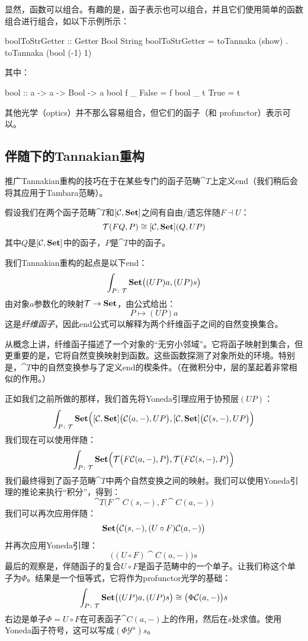 \documentclass[DaoFP]{subfiles}
\begin{document}
显然，函数可以组合。有趣的是，函子表示也可以组合，并且它们使用简单的函数组合进行组合，如以下示例所示：
\begin{haskell}
boolToStrGetter :: Getter Bool String
boolToStrGetter = toTannaka (show) . toTannaka (bool (-1) 1)
\end{haskell}
其中：
\begin{haskell}
bool :: a -> a -> Bool -> a
bool f _ False = f
bool _ t True  = t
\end{haskell}

其他光学（optics）并不那么容易组合，但它们的函子（和 profunctor）表示可以。

\subsection{伴随下的Tannakian重构}

推广Tannakian重构的技巧在于在某些专门的函子范畴$\cat T$上定义end（我们稍后会将其应用于Tambara范畴）。

假设我们在两个函子范畴$\cat T$和$[\mathcal{C}, \mathbf{Set}]$之间有自由/遗忘伴随$F \dashv U$：
\[ \mathcal{T} (F Q, P) \cong  [\mathcal{C}, \mathbf{Set}] ( Q, U P )\]
其中$Q$是$[\mathcal{C}, \mathbf{Set}]$中的函子，$P$是$\cat T$中的函子。

我们Tannakian重构的起点是以下end：
\[ \int_{P \colon \mathcal{T}} \mathbf{Set} \big((U P) a, (U P) s\big) \]
由对象$a$参数化的映射$\mathcal{T} \to \mathbf{Set}$，由公式给出：
\[ P \mapsto (U P) a \]
这是\emph{纤维函子}，因此end公式可以解释为两个纤维函子之间的自然变换集合。

从概念上讲，纤维函子描述了一个对象的“无穷小邻域”。它将函子映射到集合，但更重要的是，它将自然变换映射到函数。这些函数探测了对象所处的环境。特别是，$\cat T$中的自然变换参与了定义end的楔条件。（在微积分中，层的茎起着非常相似的作用。）

正如我们之前所做的那样，我们首先将Yoneda引理应用于协预层$(U P)$：
\[ \int_{P \colon \mathcal{T}} \mathbf{Set} \Big([\mathcal{C}, \mathbf{Set}] \big( \mathcal{C} (a ,-), U P\big), [\mathcal{C}, \mathbf{Set}] \big( \mathcal{C} (s ,-), U P\big)\Big) \]
我们现在可以使用伴随：
\[ \int_{P \colon \mathcal{T}} \mathbf{Set} \Big(\mathcal{T} \big( F \mathcal{C} (a ,-), P\big), \mathcal{T} \big( F \mathcal{C} (s ,-), P\big)\Big) \]
我们最终得到了函子范畴$\cat T$中两个自然变换之间的映射。我们可以使用Yoneda引理的推论来执行“积分”，得到：
\[ \cat T\big( F \cat C (s ,-), F \cat C (a ,-) \big) \]
我们可以再次应用伴随：
\[ \mathbf{Set} \big( \mathcal{C} (s ,-), (U\circ F) \mathcal{C} (a ,-) \big) \]
并再次应用Yoneda引理：
\[ \big( (U\circ F) \cat C (a ,-) \big) s \]
最后的观察是，伴随函子的复合$U \circ F$是函子范畴中的一个单子。让我们称这个单子为$\Phi$。结果是一个恒等式，它将作为profunctor光学的基础：
\[ \int_{P \colon \mathcal{T}} \mathbf{Set} \big((U P) a, (U P) s\big) \cong \big( \Phi \mathcal{C} (a ,-) \big) s \]
右边是单子$\Phi = U \circ F$在可表函子$\cat C (a, -)$上的作用，然后在$s$处求值。使用Yoneda函子符号，这可以写成$(\Phi \mathcal Y^a) s$。
\end{document}
